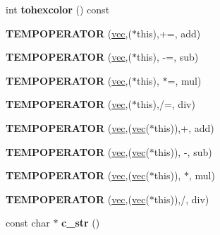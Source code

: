 \begin{DoxyCompactItemize}
\mbox{\label{structvec_a8815bbe5cb76bec3ac2b85755c910d8e}} 
int {\bfseries tohexcolor} () const
\item 
\mbox{\label{structvec_a0c7150f5e98d38c62712a7837642a3b1}} 
{\bfseries T\+E\+M\+P\+O\+P\+E\+R\+A\+T\+OR} (\hyperlink{structvec}{vec},($\ast$this),+=, add)
\item 
\mbox{\label{structvec_ad05263a11b9511dabf3b33efaa074942}} 
{\bfseries T\+E\+M\+P\+O\+P\+E\+R\+A\+T\+OR} (\hyperlink{structvec}{vec},($\ast$this), -\/=, sub)
\item 
\mbox{\label{structvec_ae5211b36f621fd0c25b12c5b3b56c331}} 
{\bfseries T\+E\+M\+P\+O\+P\+E\+R\+A\+T\+OR} (\hyperlink{structvec}{vec},($\ast$this), $\ast$=, mul)
\item 
\mbox{\label{structvec_a3f657b442fcf2ffe57103f962193458c}} 
{\bfseries T\+E\+M\+P\+O\+P\+E\+R\+A\+T\+OR} (\hyperlink{structvec}{vec},($\ast$this),/=, div)
\item 
\mbox{\label{structvec_a0b03aa190f28be74ab6b420c02c9f081}} 
{\bfseries T\+E\+M\+P\+O\+P\+E\+R\+A\+T\+OR} (\hyperlink{structvec}{vec},(\hyperlink{structvec}{vec}($\ast$this)),+, add)
\item 
\mbox{\label{structvec_af600e83c3425660852ff3103ee13af52}} 
{\bfseries T\+E\+M\+P\+O\+P\+E\+R\+A\+T\+OR} (\hyperlink{structvec}{vec},(\hyperlink{structvec}{vec}($\ast$this)), -\/, sub)
\item 
\mbox{\label{structvec_af700fa0bf6124c8feaad31c0e9b0470c}} 
{\bfseries T\+E\+M\+P\+O\+P\+E\+R\+A\+T\+OR} (\hyperlink{structvec}{vec},(\hyperlink{structvec}{vec}($\ast$this)), $\ast$, mul)
\item 
\mbox{\label{structvec_ad17e7eda28632a776cabd48905cf89f2}} 
{\bfseries T\+E\+M\+P\+O\+P\+E\+R\+A\+T\+OR} (\hyperlink{structvec}{vec},(\hyperlink{structvec}{vec}($\ast$this)),/, div)
\item 
\mbox{\label{structvec_a7cfac702c37c6cd290a9e222073d5c85}} 
const char $\ast$ {\bfseries c\+\_\+str} ()
\end{DoxyCompactItemize}
